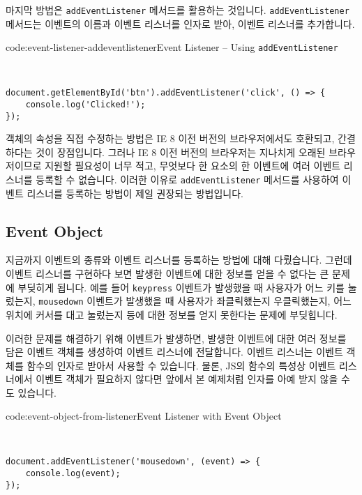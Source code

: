 마지막 방법은 \texttt{addEventListener} 메서드를 활용하는 것입니다. \texttt{addEventListener} 메서드는 이벤트의 이름과 이벤트 리스너를 인자로 받아, 이벤트 리스너를 추가합니다.

\begin{codeenv}{code:event-listener-addeventlistener}{Event Listener – Using \texttt{addEventListener}}\begin{verbatim}


document.getElementById('btn').addEventListener('click', () => {
    console.log('Clicked!');
});
\end{verbatim}
\end{codeenv}

객체의 속성을 직접 수정하는 방법은 IE 8 이전 버전의 브라우저에서도 호환되고, 간결하다는 것이 장점입니다. 그러나 IE 8 이전 버전의 브라우저는 지나치게 오래된 브라우저이므로 지원할 필요성이 너무 적고, 무엇보다 한 요소의 한 이벤트에 여러 이벤트 리스너를 등록할 수 없습니다. 이러한 이유로 \texttt{addEventListener} 메서드를 사용하여 이벤트 리스너를 등록하는 방법이 제일 권장되는 방법입니다.

\subsection*{Event Object}

지금까지 이벤트의 종류와 이벤트 리스너를 등록하는 방법에 대해 다뤘습니다. 그런데 이벤트 리스너를 구현하다 보면 발생한 이벤트에 대한 정보를 얻을 수 없다는 큰 문제에 부딪히게 됩니다. 예를 들어 \texttt{keypress} 이벤트가 발생했을 때 사용자가 어느 키를 눌렀는지, \texttt{mousedown} 이벤트가 발생했을 때 사용자가 좌클릭했는지 우클릭했는지, 어느 위치에 커서를 대고 눌렀는지 등에 대한 정보를 얻지 못한다는 문제에 부딪힙니다.

이러한 문제를 해결하기 위해 이벤트가 발생하면, 발생한 이벤트에 대한 여러 정보를 담은 이벤트 객체를 생성하여 이벤트 리스너에 전달합니다. 이벤트 리스너는 이벤트 객체를 함수의 인자로 받아서 사용할 수 있습니다. 물론, JS의 함수의 특성상 이벤트 리스너에서 이벤트 객체가 필요하지 않다면 앞에서 본 예제처럼 인자를 아예 받지 않을 수도 있습니다.

\begin{codeenv}{code:event-object-from-listener}{Event Listener with Event Object}\begin{verbatim}


document.addEventListener('mousedown', (event) => {
    console.log(event);
});
\end{verbatim}
\end{codeenv}

